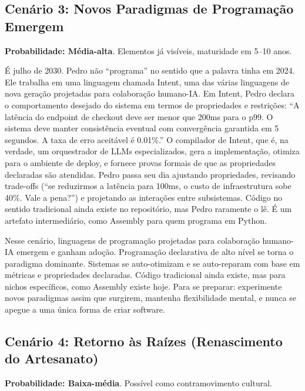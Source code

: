\subsection{Cenário 3: Novos Paradigmas de Programação Emergem}

\textbf{Probabilidade: Média-alta}. Elementos já visíveis, maturidade em 5--10 anos.

É julho de 2030. Pedro não ``programa'' no sentido que a palavra tinha em 2024. Ele trabalha em uma linguagem chamada Intent, uma das várias linguagens de nova geração projetadas para colaboração humano-IA. Em Intent, Pedro declara o comportamento desejado do sistema em termos de propriedades e restrições: ``A latência do endpoint de checkout deve ser menor que 200ms para o p99. O sistema deve manter consistência eventual com convergência garantida em 5 segundos. A taxa de erro aceitável é 0.01\%.'' O compilador de Intent, que é, na verdade, um orquestrador de LLMs especializados, gera a implementação, otimiza para o ambiente de deploy, e fornece provas formais de que as propriedades declaradas são atendidas. Pedro passa seu dia ajustando propriedades, revisando trade-offs (``se reduzirmos a latência para 100ms, o custo de infraestrutura sobe 40\%. Vale a pena?'') e projetando as interações entre subsistemas. Código no sentido tradicional ainda existe no repositório, mas Pedro raramente o lê. É um artefato intermediário, como Assembly para quem programa em Python.

Nesse cenário, linguagens de programação projetadas para colaboração humano-IA emergem e ganham adoção. Programação declarativa de alto nível se torna o paradigma dominante. Sistemas se auto-otimizam e se auto-reparam com base em métricas e propriedades declaradas. Código tradicional ainda existe, mas para nichos específicos, como Assembly existe hoje. Para se preparar: experimente novos paradigmas assim que surgirem, mantenha flexibilidade mental, e nunca se apegue a uma única forma de criar software.

\subsection{Cenário 4: Retorno às Raízes (Renascimento do Artesanato)}

\textbf{Probabilidade: Baixa-média}. Possível como contramovimento cultural.

